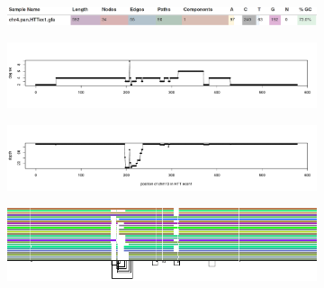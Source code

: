 \begin{figure}[h!]
	\begin{subfigure}{\linewidth}
		\caption{}
		\centering
		\includegraphics[width=1.0\linewidth, trim=-1.25cm 3cm 0 1.75cm]{fig/metrics/chr4_pan_HTTex1_gfa_multiqc_odgi_stats}
		\label{fig:metrics-multiqc}
	\end{subfigure}
	\begin{subfigure}{1\linewidth}
	\caption{}
	\centering
	\includegraphics[width=\linewidth,trim=+.225cm 3cm +.425cm +3cm]{fig/metrics/chr4_HTT_chm13_degree_w1_bed}
	\label{fig:metrics-degree}
	\end{subfigure}
	\begin{subfigure}{\linewidth}
	\caption{}
	\centering
	\includegraphics[width=\linewidth,trim=+.225cm 3cm +0.425cm +3cm]{fig/metrics/chr4_HTT_chm13_depth_w1_bed}
	\label{fig:metrics-depth}
	\end{subfigure}
	\begin{subfigure}{\linewidth}
		\caption{}
		\centering
		\includegraphics[width=1.0\linewidth, trim=-1.5cm 2cm -0.1cm 0.5cm]{fig/metrics/chr4.pan.fa.a2fb268.e820cd3.9ea71d8.smooth.gfa.og.HTTex1.og.O.og.tiny.og}
		\label{fig:metrics-viz}
	\end{subfigure}

\end{figure}

